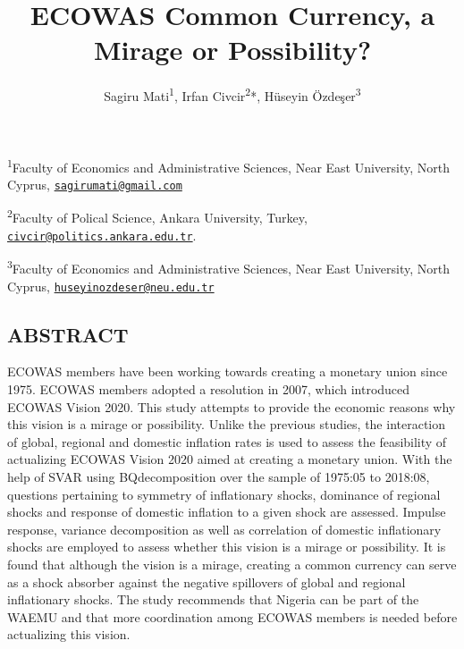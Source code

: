 \documentclass[]{article}
\title{ECOWAS Common Currency, a Mirage or Possibility?}
\author{Sagiru Mati\textsuperscript{1}, Irfan Civcir\textsuperscript{2}*, Hüseyin Özdeşer\textsuperscript{3}}
\date{}
\begin{document}
\maketitle

\thispagestyle{empty}

\textsuperscript{1}Faculty of Economics and Administrative Sciences, Near East University, North Cyprus, \href{mailto:sagirumati@gmail.com}{\nolinkurl{sagirumati@gmail.com}}

\textsuperscript{2}Faculty of Polical Science, Ankara University, Turkey, \href{mailto:civcir@politics.ankara.edu.tr}{\nolinkurl{civcir@politics.ankara.edu.tr}}.

\textsuperscript{3}Faculty of Economics and Administrative Sciences, Near East University, North Cyprus, \href{mailto:huseyinozdeser@neu.edu.tr}{\nolinkurl{huseyinozdeser@neu.edu.tr}}

\begin{center} 

\section*{ABSTRACT}

\end{center}

 \ac{ECOWAS} members have been working towards creating a monetary union since 1975. \ac{ECOWAS} members adopted a resolution in 2007, which introduced ECOWAS Vision 2020. This study attempts to provide the economic reasons why this vision is a mirage or possibility. Unlike the previous studies, the interaction of global, regional and domestic inflation rates is used to assess the feasibility of actualizing \ac{ECOWAS} Vision 2020 aimed at creating a monetary union. With the help of  \ac{SVAR} using  \ac{BQ}decomposition over the sample of 1975:05 to 2018:08, questions pertaining to symmetry of inflationary shocks, dominance of regional shocks and response of domestic inflation to a given shock are assessed. Impulse response, variance decomposition as well as correlation of domestic inflationary shocks are employed to assess whether this vision is a mirage or possibility. It is found that although the vision is a mirage, creating a common currency can serve as a shock absorber against the negative spillovers of global and regional inflationary shocks. The study recommends that Nigeria can be part of the WAEMU and that more coordination among ECOWAS members is needed before actualizing this vision.
\end{document}
